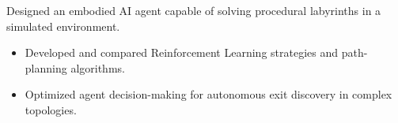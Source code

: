 Designed an embodied AI agent capable of solving procedural labyrinths in a simulated environment.
\begin{itemize}
\item Developed and compared Reinforcement Learning strategies and path-planning algorithms.
\item Optimized agent decision-making for autonomous exit discovery in complex topologies.
\end{itemize}
{\LaTeXraggedright
{}
\par}
